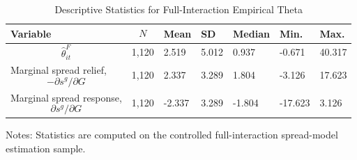 \begin{table}[H]\centering
\begin{threeparttable}
\caption{Descriptive Statistics for Full-Interaction Empirical Theta}
\label{tab:theta_descriptive_stats}
\scriptsize
\begin{tabularx}{\textwidth}{lYYYYYY}
\toprule
Variable & $$N$$ & Mean & SD & Median & Min. & Max. \\
\midrule
$$\widehat{\theta}^{F}_{it}$$ & 1,120 & 2.519 & 5.012 & 0.937 & -0.671 & 40.317 \\
Marginal spread relief, $$-\partial s^g/\partial G$$ & 1,120 & 2.337 & 3.289 & 1.804 & -3.126 & 17.623 \\
Marginal spread response, $$\partial s^g/\partial G$$ & 1,120 & -2.337 & 3.289 & -1.804 & -17.623 & 3.126 \\
\bottomrule
\end{tabularx}
\begin{tablenotes}[flushleft]\footnotesize
\item Notes: Statistics are computed on the controlled full-interaction spread-model estimation sample.
\end{tablenotes}
\end{threeparttable}
\end{table}
